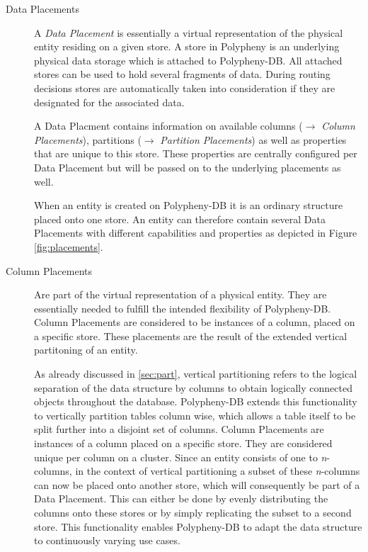 \begin{description}
    \item [Data Placements] A \emph{Data Placement} is essentially a virtual representation of the physical entity residing on a given store.
    A store in Polypheny is an underlying physical data storage which is attached to Polypheny-DB.
    All attached stores can be used to hold several fragments of data. 
    During routing decisions stores are automatically taken into consideration if they are designated for the associated data.
    
    A Data Placment contains information on available columns ($\rightarrow$ \emph{Column Placements}), partitions ($\rightarrow$ \emph{Partition Placements})
    as well as properties that are unique to this store. These properties are centrally configured per Data Placement but will be passed on to the underlying placements as well.
    
    When an entity is created on Polypheny-DB it is an ordinary structure placed onto one store.
    An entity can therefore contain several Data Placements with different capabilities and properties as depicted in Figure \ref{fig:placements}. 
    
    

    \item [Column Placements]
    Are part of the virtual representation of a physical entity. They are essentially needed to fulfill the intended flexibility of Polypheny-DB. 
    Column Placements are considered to be instances of a column, placed on a specific store.
    These placements are the result of the extended vertical partitoning of an entity.


    As already discussed in \ref{sec:part}, vertical partitioning refers to the logical 
    separation of the data structure by columns to obtain logically connected objects throughout 
    the database. Polypheny-DB extends this functionality to vertically partition tables
    column wise, which allows a table itself to be split further into a disjoint 
    set of columns.
    Column Placements are instances of a column placed on a specific store.
    They are considered unique per column on a cluster.
    Since an entity consists of one to \textit{n}-columns,
    in the context of vertical partitioning a subset of these \textit{n}-columns can now 
    be placed onto another store, which will consequently be part of a Data Placement.
    This can either be done by evenly distributing the columns onto these stores 
    or by simply replicating the subset to a second store.
    This functionality enables Polypheny-DB to adapt the data structure to continuously 
    varying use cases.\\


\end{description}
